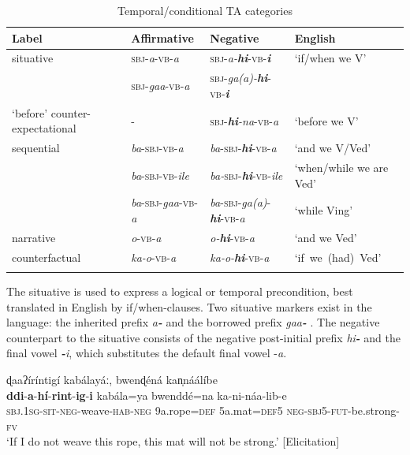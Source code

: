 \documentclass[output=paper,colorlinks=true, citecolor=brown,draftmode]{langscibook}
\begin{document}
\begin{table}
\begin{tabularx}{\textwidth}{QllQ}
\lsptoprule
{Label} & {Affirmative} & {Negative} & {English} \\
\midrule 
situative & \textsc{sbj}-\textit{a}-\textsc{vb}-\textit{a} & \textsc{sbj}-\textit{a-\textbf{hi}}-\textsc{vb}-\textit{\textbf{i}} & ‘if/when we V’ \\
 & \textsc{sbj}-\textit{gaa}-\textsc{vb}-\textit{a} & \textsc{sbj}-\textit{ga(a)-\textbf{hi}}-\textsc{vb}-\textit{\textbf{i}} &  \\
\tablevspace
 ‘before’ counter-expectational  & - & \textsc{sbj}-\textit{\textbf{hi}-na}-\textsc{vb}-\textit{a} & ‘before we V’ \\
\tablevspace
sequential & \textit{ba}-\textsc{sbj}-\textsc{vb}-\textit{a} & \textit{ba}-\textsc{sbj}-\textit{\textbf{hi}}-\textsc{vb}-\textit{a} & ‘and we V/Ved’ \\
 & \textit{ba}-\textsc{sbj}-\textsc{vb}-\textit{ile} & \textit{ba-}\textsc{sbj}-\textit{\textbf{hi}}-\textsc{vb}-\textit{ile} & ‘when/while we are Ved’  \\
 & \textit{ba}-\textsc{sbj}-\textit{gaa}-\textsc{vb}-\textit{a} & \textit{ba}-\textsc{sbj}-\textit{ga(a)}-\textit{\textbf{hi}}-\textsc{vb}-\textit{a} & ‘while Ving’ \\
\tablevspace
narrative & \textit{o}-\textsc{vb}-\textit{a} & \textit{o-\textbf{hi}}-\textsc{vb}-\textit{a} & ‘and we Ved’ \\
\tablevspace
counterfactual  & \textit{ka-o}-\textsc{vb}-\textit{a} & \textit{ka-o-\textbf{hi}}-\textsc{vb}-\textit{a} & \mbox{‘if we (had) Ved’} \\
\lspbottomrule
\end{tabularx}
\caption{Temporal/conditional TA categories}
\label{tab:cuw:5}
\end{table}

The situative is used to express a logical or temporal precondition, best translated in English by if/when-clauses. Two situative markers exist in the language: the inherited prefix \textit{a}\textbf{\textit{{}-}}  and the borrowed prefix \textit{gaa}\textbf{\textit{{}-}}  \citep{Guérois2017}. The negative counterpart to the situative consists of the negative post-initial prefix \textit{hi}\textbf{\textit{{}-}} and the final vowel \textbf{\textit{{}-}}\textit{i}, which substitutes the default final vowel {}-\textit{a}. 


\ea\label{ex:cuw:40} ɖaaʔíríntigí kabálayáː, bwenɖéná kan̩náálíbe\\ 
    \gll  \textbf{ddi}{}-\textbf{a}{}-\textbf{hí}{}-\textbf{rint}{}-\textbf{ig}{}-\textbf{i} kabála=ya bwenddé=na ka-ni-náa-lib-e\\
          \textsc{sbj.1sg-sit-neg}{}-weave-\textsc{hab-neg} 9a.rope=\textsc{def} 5a.mat=\textsc{def5} \textsc{neg-sbj5-fut}{}-be.strong-\textsc{fv}\\
    \glt  ‘If I do not weave this rope, this mat will not be strong.’ [Elicitation]
\z 
\end{document}
